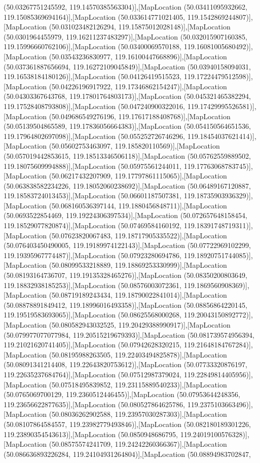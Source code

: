 (50.03267751245592, 119.14570385563304)],[MapLocation (50.03411095932662, 119.15085369694164)],[MapLocation (50.033614771021405, 119.1542869244807)],[MapLocation (50.031023482126294, 119.15875012028148)],[MapLocation (50.0301964455979, 119.16211237483297)],[MapLocation (50.032015907160385, 119.15996660762106)],[MapLocation (50.03400069570188, 119.16081005680492)],[MapLocation (50.03543236830977, 119.16100447668896)],[MapLocation (50.037361887656694, 119.16272109045849)],[MapLocation (50.03940158094031, 119.16538184180126)],[MapLocation (50.04126419515523, 119.17224479512598)],[MapLocation (50.04226196917922, 119.17346862154247)],[MapLocation (50.04303367643768, 119.17801764803173)],[MapLocation (50.045321465382294, 119.17528408793808)],[MapLocation (50.047240900322016, 119.17429995526581)],[MapLocation (50.049686549276196, 119.17617188408768)],[MapLocation (50.05139504865589, 119.17836056664383)],[MapLocation (50.054150564651536, 119.17964802697098)],[MapLocation (50.055252726746296, 119.18454037621414)],[MapLocation (50.05602753463097, 119.185820110569)],[MapLocation (50.057019442853615, 119.18513346506118)],[MapLocation (50.05762559889502, 119.18075609994888)],[MapLocation (50.05975561244011, 119.17763068783745)],[MapLocation (50.06217432207909, 119.17797861115065)],[MapLocation (50.063838582234226, 119.18052060238692)],[MapLocation (50.06489167120887, 119.18583724013453)],[MapLocation (50.06601187507381, 119.18735903936329)],[MapLocation (50.068160536397144, 119.1880456848711)],[MapLocation (50.0693522854469, 119.19224306397534)],[MapLocation (50.072657648158454, 119.18529077820874)],[MapLocation (50.07469584160192, 119.18391748719311)],[MapLocation (50.07623820067483, 119.18717905335522)],[MapLocation (50.076403450490005, 119.19189974122143)],[MapLocation (50.07722969102299, 119.19395967774487)],[MapLocation (50.07923280694786, 119.18920751744085)],[MapLocation (50.08099533218889, 119.18869253330999)],[MapLocation (50.08193164736707, 119.19135328465276)],[MapLocation (50.08350200803649, 119.18832938185253)],[MapLocation (50.08576003072361, 119.1869560908369)],[MapLocation (50.08719189243434, 119.18790022841014)],[MapLocation (50.08878891849412, 119.18996016493358)],[MapLocation (50.08856864220145, 119.19519583693065)],[MapLocation (50.08625568000268, 119.20043150892772)],[MapLocation (50.080582943032525, 119.20429388990917)],[MapLocation (50.079977077077984, 119.20515219679393)],[MapLocation (50.081739574956394, 119.21021620741405)],[MapLocation (50.07942628320215, 119.21648184767284)],[MapLocation (50.08195988263505, 119.22403494825878)],[MapLocation (50.08091341214408, 119.22643820753612)],[MapLocation (50.07733320876197, 119.22635237684764)],[MapLocation (50.07512987379024, 119.22849814405956)],[MapLocation (50.07518495839852, 119.23115889540233)],[MapLocation (50.0765069700129, 119.2360512446455)],[MapLocation (50.07953644248356, 119.23656622877635)],[MapLocation (50.080527864625786, 119.2375103663496)],[MapLocation (50.08036262902588, 119.23957030287303)],[MapLocation (50.08107864584557, 119.23982779493846)],[MapLocation (50.082180189301226, 119.23890354543613)],[MapLocation (50.0850948686795, 119.24019100576328)],[MapLocation (50.08575574241709, 119.24242260366367)],[MapLocation (50.086636893226284, 119.24104931264804)],[MapLocation (50.08894983702847, 
